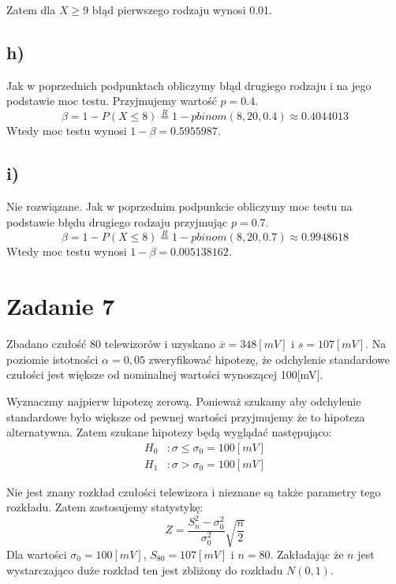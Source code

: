 \documentclass{article}
\begin{document}
Zatem dla $X \geq 9$ błąd pierwszego rodzaju wynosi 0.01.

\subsection{h)}
Jak w poprzednich podpunktach obliczymy błąd drugiego rodzaju i na jego podstawie moc testu. Przyjmujemy wartość $p = 0.4$.
\[ \beta = 1 - P(X \leq 8) \overset{R}{=} 1 - pbinom(8, 20, 0.4) \approx 0.4044013 \]
Wtedy moc testu wynosi $1 - \beta = 0.5955987$.

\subsection{i)}
Nie rozwiązane.
Jak w poprzednim podpunkcie obliczymy moc testu na podstawie błędu drugiego rodzaju przyjmując $p = 0.7$.
\[ \beta = 1 - P(X \leq 8) \overset{R}{=} 1 - pbinom(8, 20, 0.7) \approx 0.9948618 \]
Wtedy moc testu wynosi $1 - \beta = 0.005138162$.



\newpage
\section{Zadanie 7}
Zbadano czułość 80 telewizorów i uzyskano $\overline{x}=348[mV]$ i $s=107[mV]$. Na poziomie istotności $\alpha=0,05$ zweryfikować hipotezę, że odchylenie standardowe czułości jest większe od nominalnej wartości wynoszącej 100[mV]. \\ \par

Wyznaczmy najpierw hipotezę zerową. Ponieważ szukamy aby odchylenie standardowe było większe od pewnej wartości przyjmujemy że to hipoteza alternatywna. Zatem szukane hipotezy będą wyglądać następująco:
\begin{align*}
H_0 &: \sigma \leq \sigma_0 = 100 [mV] \\
H_1 &: \sigma > \sigma_0 = 100 [mV]
\end{align*}

Nie jest znany rozkład czułości telewizora i nieznane są także parametry tego rozkładu. Zatem zastosujemy statystykę:
\[ Z = \frac{S_n^2-\sigma_0^2}{\sigma_0^2} \sqrt{\frac{n}{2}} \]
Dla wartości $\sigma_0 = 100 [mV]$, $S_{80} = 107 [mV]$ i $n=80$. Zakładając że $n$ jest wystarczająco duże rozkład ten jest zbliżony do rozkładu $N(0,1)$. \\ \par
\end{document}
